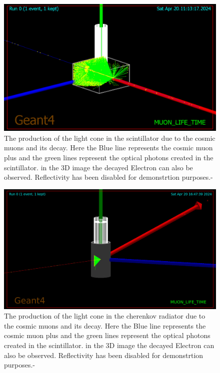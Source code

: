 \documentclass{article}
\begin{document}
\begin{multicols}{2}
\begin{figure}[H]
    \centering
    \includegraphics[width = \columnwidth]{Images/scint_sim_2.png}
    \caption{The production of the light cone in the scintillator due to the cosmic muons and its decay. Here the Blue line represents the cosmic muon plus and the green lines represent the optical photons created in the scintillator. in the 3D image the decayed Electron can also be observed. Reflectivity has been disabled for demonstrtion purposes.-\cite{agostinelli2003geant4}}
    \label{sim_run}
\end{figure}


\begin{figure}[H]
    \centering
    \includegraphics[width = \columnwidth]{Images/cher_sim_2.jpeg}
    \caption{The production of the light cone in the cherenkov radiator due to the cosmic muons and its decay. Here the Blue line represents the cosmic muon plus and the green lines represent the optical photons created in the scintillator. in the 3D image the decayed Electron can also be observed. Reflectivity has been disabled for demonstrtion purposes.-\cite{agostinelli2003geant4} }
    \label{sim_cher}
\end{figure}



\end{multicols}
\end{document}
